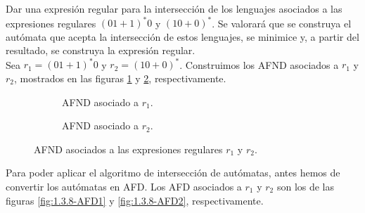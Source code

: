 \begin{ejercicio}\label{ej:1.3.8}
    Dar una expresión regular para la intersección de los lenguajes asociados a las expresiones regulares ${(01+1)}^{\ast}0$ y ${(10+0)}^{\ast}$. Se valorará que se construya el autómata que acepta la intersección de estos lenguajes, se minimice y, a partir del resultado, se construya la expresión regular.\\

    Sea $r_1=(01+1)^{\ast}0$ y $r_2=(10+0)^{\ast}$. Construimos los AFND asociados a $r_1$ y $r_2$, mostrados en las figuras \ref{fig:1.3.8-AFND1} y \ref{fig:1.3.8-AFND2}, respectivamente.
    \begin{figure}
        \centering
        \begin{subfigure}[c]{0.45\textwidth}
            \centering
            \caption{AFND asociado a $r_1$.}
            \label{fig:1.3.8-AFND1}
        \end{subfigure}
        \begin{subfigure}[c]{0.45\textwidth}
            \centering
            \caption{AFND asociado a $r_2$.}
            \label{fig:1.3.8-AFND2}
        \end{subfigure}
        \caption{AFND asociados a las expresiones regulares $r_1$ y $r_2$.}
        \label{fig:1.3.8-AFND}
    \end{figure}

    Para poder aplicar el algoritmo de intersección de autómatas, antes hemos de convertir los autómatas en AFD. Los AFD asociados a $r_1$ y $r_2$ son los de las figuras \ref{fig:1.3.8-AFD1} y \ref{fig:1.3.8-AFD2}, respectivamente.
    \begin{figure}[H]
        \centering
        \begin{subfigure}[c]{0.45\textwidth}
            \centering
\end{subfigure}
\end{figure}
\end{ejercicio}
